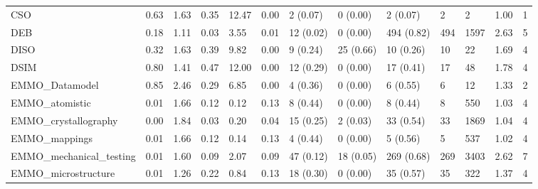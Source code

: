 \begin{table}
\begin{tabular}{m{3.5cm}m{2cm}m{2cm}m{2cm}m{2cm}m{2cm}m{2cm}m{2cm}m{2cm}m{2cm}m{2cm}m{2cm}m{2cm}}
CSO                         &                0.63 &                  1.63 &                   0.35 &              12.47 &               0.00 &             2 (0.07) &   0 (0.00) &    2 (0.07) &    2 &               2 &     1.00 &          1 \\
DEB                         &                0.18 &                  1.11 &                   0.03 &               3.55 &               0.01 &            12 (0.02) &   0 (0.00) &  494 (0.82) &  494 &            1597 &     2.63 &          5 \\
DISO                        &                0.32 &                  1.63 &                   0.39 &               9.82 &               0.00 &             9 (0.24) &  25 (0.66) &   10 (0.26) &   10 &              22 &     1.69 &          4 \\
DSIM                        &                0.80 &                  1.41 &                   0.47 &              12.00 &               0.00 &            12 (0.29) &   0 (0.00) &   17 (0.41) &   17 &              48 &     1.78 &          4 \\
EMMO\_Datamodel              &                0.85 &                  2.46 &                   0.29 &               6.85 &               0.00 &             4 (0.36) &   0 (0.00) &    6 (0.55) &    6 &              12 &     1.33 &          2 \\
EMMO\_atomistic              &                0.01 &                  1.66 &                   0.12 &               0.12 &               0.13 &             8 (0.44) &   0 (0.00) &    8 (0.44) &    8 &             550 &     1.03 &          4 \\
EMMO\_crystallography        &                0.00 &                  1.84 &                   0.03 &               0.20 &               0.04 &            15 (0.25) &   2 (0.03) &   33 (0.54) &   33 &            1869 &     1.04 &          4 \\
EMMO\_mappings               &                0.01 &                  1.66 &                   0.12 &               0.14 &               0.13 &             4 (0.44) &   0 (0.00) &    5 (0.56) &    5 &             537 &     1.02 &          4 \\
EMMO\_mechanical\_testing     &                0.01 &                  1.60 &                   0.09 &               2.07 &               0.09 &            47 (0.12) &  18 (0.05) &  269 (0.68) &  269 &            3403 &     2.62 &          7 \\
EMMO\_microstructure         &                0.01 &                  1.26 &                   0.22 &               0.84 &               0.13 &            18 (0.30) &   0 (0.00) &   35 (0.57) &   35 &             322 &     1.37 &          4 \\

\end{tabular}
\end{table}
